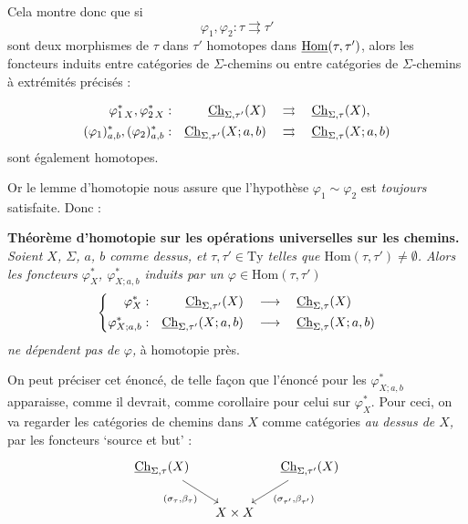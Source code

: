 Cela montre donc que si
\[
\varphi_1,\varphi_2:\tau\rightrightarrows\tau'
\]
sont deux morphismes de $\tau$ dans $\tau'$ homotopes dans $\underline{\mathrm{Hom}}(\tau,\tau')$, alors les foncteurs induits entre catégories de $\Sigma$-chemins ou entre catégories de $\Sigma$-chemins à extrémités précisés : %

\[
\begin{aligned}
\varphi^*_{1\,X},\varphi^*_{2\,X} : && \underline{\mathrm{Ch}}_{\Sigma,\tau'}(X) &\quad\rightrightarrows\quad\underline{\mathrm{Ch}}_{\Sigma,\tau}(X),\\
(\varphi_1)^*_{a,b},(\varphi_2)^*_{a,b} : && \underline{\mathrm{Ch}}_{\Sigma,\tau'}(X;a,b) &\quad\rightrightarrows\quad\underline{\mathrm{Ch}}_{\Sigma,\tau}(X;a,b)
\end{aligned}
\]
sont également homotopes.

Or le lemme d'homotopie nous assure que l'hypothèse $\varphi_1\sim\varphi_2$ est \textit{toujours} satisfaite. Donc :

\textbf{Théorème d'homotopie sur les opérations universelles sur les chemins.} \textit{Soient $X$, $\Sigma$, $a$, $b$ comme dessus, et $\tau,\tau'\in\mathrm{Ty}$ telles que $\mathrm{Hom}(\tau,\tau')\neq\emptyset$. Alors les foncteurs $\varphi^*_X$, $\varphi^*_{X;a,b}$ induits par un $\varphi\in\mathrm{Hom}(\tau,\tau')$}
\[
\left\{
\begin{aligned}
\varphi^*_X : && \underline{\mathrm{Ch}}_{\Sigma,\tau'}(X) &\quad\longrightarrow\quad\underline{\mathrm{Ch}}_{\Sigma,\tau}(X)\\
\varphi^*_{X;a,b} : && \underline{\mathrm{Ch}}_{\Sigma,\tau'}(X;a,b) &\quad\longrightarrow\quad\underline{\mathrm{Ch}}_{\Sigma,\tau}(X;a,b)
\end{aligned}
\right.
\]
\textit{ne dépendent pas de $\varphi$,} à homotopie près.

On peut préciser cet énoncé, de telle façon que l'énoncé pour les $\varphi^*_{X;a,b}$ apparaisse, comme il devrait, comme corollaire pour celui sur $\varphi^*_X$. Pour ceci, on va regarder les catégories de chemins dans $X$ comme catégories \textit{au dessus de $X$,} par les foncteurs `source et but' :
\[
\begin{tikzcd}[column sep=small]
\uCh_{\Sigma,\tau}(X) \arrow[dr, "(\sigma_\tau{,}\beta_\tau)"'] & & \uCh_{\Sigma,\tau'}(X) \arrow[dl, "(\sigma_{\tau'}{,}\beta_{\tau'})"]\\
 & X\times X &
\end{tikzcd}
\]

\newpage
{}


